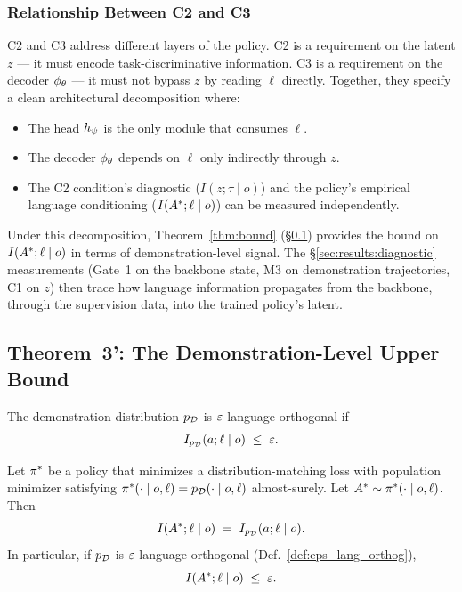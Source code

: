 \subsubsection{Relationship Between C2 and C3}
\label{sec:theory:c2_c3_relation}

C2 and C3 address different layers of the policy. C2 is a requirement on the latent $z$
--- it must encode task-discriminative information. C3 is a requirement on the decoder
$\phi_{\theta}$ --- it must not bypass $z$ by reading $\ell$ directly. Together, they specify
a clean architectural decomposition where:
\begin{itemize}
\item The head $h_{\psi}$ is the only module that consumes $\ell$.
\item The decoder $\phi_{\theta}$ depends on $\ell$ only indirectly through $z$.
\item The C2 condition's diagnostic ($I(z; \tau \mid o)$) and the policy's empirical
      language conditioning ($I(A^{*}; \ell \mid o)$) can be measured independently.
\end{itemize}

Under this decomposition, Theorem~\ref{thm:bound} (\S\ref{sec:theory:bound}) provides the
bound on $I(A^{*}; \ell \mid o)$ in terms of demonstration-level signal. The
\S\ref{sec:results:diagnostic} measurements (Gate~1 on the backbone state, M3 on
demonstration trajectories, C1 on $z$) then trace how language information propagates from
the backbone, through the supervision data, into the trained policy's latent.

\subsection{Theorem~3': The Demonstration-Level Upper Bound}
\label{sec:theory:bound}

\begin{definition}
\label{def:eps_lang_orthog}
The demonstration distribution $p_{\mathcal{D}}$ is $\varepsilon$-language-orthogonal if
\begin{equation}
I_{p_{\mathcal{D}}}(a; \ell \mid o) \;\le\; \varepsilon.
\label{eq:eps_orthog}
\end{equation}
\end{definition}

\begin{theorem}
\label{thm:bound}
Let $\pi^{*}$ be a policy that minimizes a distribution-matching loss with population
minimizer satisfying $\pi^{*}(\cdot \mid o, \ell) = p_{\mathcal{D}}(\cdot \mid o, \ell)$
almost-surely. Let $A^{*} \sim \pi^{*}(\cdot \mid o, \ell)$. Then
\begin{equation}
I(A^{*}; \ell \mid o) \;=\; I_{p_{\mathcal{D}}}(a; \ell \mid o).
\label{eq:thm_bound}
\end{equation}
In particular, if $p_{\mathcal{D}}$ is $\varepsilon$-language-orthogonal (Def.~\ref{def:eps_lang_orthog}),
\begin{equation}
I(A^{*}; \ell \mid o) \;\le\; \varepsilon.
\label{eq:thm_bound_eps}
\end{equation}
\end{theorem}


